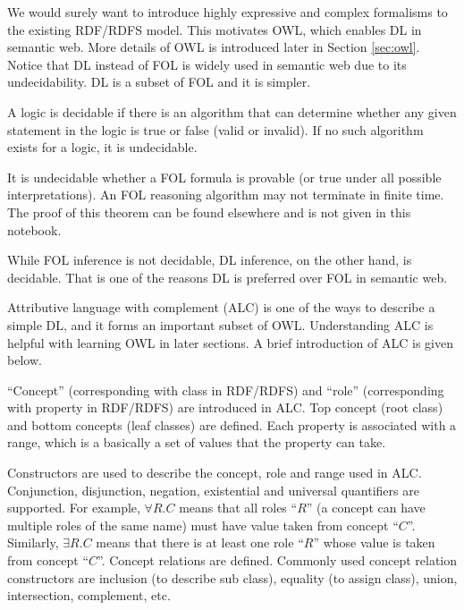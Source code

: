 \begin{shortbox}
	

We would surely want to introduce highly expressive and complex formalisms to the existing RDF/RDFS model. This motivates OWL, which enables DL in semantic web. More details of OWL is introduced later in Section \ref{sec:owl}. Notice that DL instead of FOL is widely used in semantic web due to its undecidability. DL is a subset of FOL and it is simpler.

A logic is decidable if there is an algorithm that can determine whether any given statement in the logic is true or false (valid or invalid).  If no such algorithm exists for a logic, it is undecidable.

It is undecidable whether a FOL formula is provable (or true under all possible interpretations). An FOL reasoning algorithm may not terminate in finite time. The proof of this theorem can be found elsewhere and is not given in this notebook.

While FOL inference is not decidable, DL inference, on the other hand, is decidable. That is one of the reasons DL is preferred over FOL in semantic web.
	
\end{shortbox}

Attributive language with complement (ALC) is one of the ways to describe a simple DL, and it forms an important subset of OWL. Understanding ALC is helpful with learning OWL in later sections. A brief introduction of ALC is given below.

``Concept'' (corresponding with class in RDF/RDFS) and ``role'' (corresponding with property in RDF/RDFS) are introduced in ALC. Top concept (root class) and bottom concepts (leaf classes) are defined. Each property is associated with a range, which is a basically a set of values that the property can take.

Constructors are used to describe the concept, role and range used in ALC. Conjunction, disjunction, negation, existential and universal quantifiers are supported. For example, $\forall R.C$ means that all roles ``$R$'' (a concept can have multiple roles of the same name) must have value taken from concept ``$C$''. Similarly, $\exists R.C$ means that there is at least one role ``$R$'' whose value is taken from concept ``$C$''. Concept relations are defined. Commonly used concept relation constructors are inclusion (to describe sub class), equality (to assign class), union, intersection, complement, etc.

